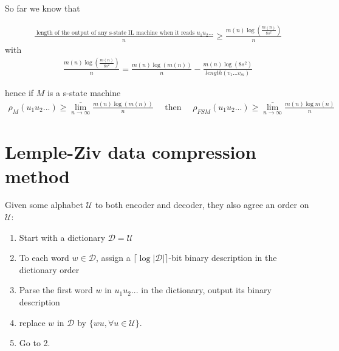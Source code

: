 \documentclass{article}
\theoremstyle{definition} %
\def\D{\mathcal{D}}
\def\U{\mathcal{U}}
\begin{document}
So far we know that

\begin{align*}
  \frac{\text{ length of the output of any s-state IL machine when it reads } u_1 u_2 ... }{n} \geq \frac{m(n) \log(\frac{m(n)}{8 s^2})}{n}
\end{align*}
with
\begin{align*}
  \frac{m(n) \log(\frac{m(n)}{8 s^2})}{n} = \frac{m(n) \log(m(n))}{n} - \frac{m(n) \log(8 s^2)}{length(v_1 ... v_m)}
\end{align*}

hence if $M$ is a s-state machine
\begin{align*}
  \rho_M (u_1 u_2 ...) \geq \overline{\lim_{n \to \infty}} \frac{m(n) \log(m(n))}{n}
  \quad \text{ then } \quad
  \rho_{FSM} (u_1 u_2 ...) \geq \overline{\lim_{n \to \infty}} \frac{m(n) \log m(n)}{n}
\end{align*}



\newpage
\section{Lemple-Ziv data compression method}

Given some alphabet $\U$ to both encoder and decoder, they also agree an order on $\U$:

\begin{enumerate}
  \item Start with a dictionary $\D = \U$
  \item To each word $w \in \D$, assign a $\lceil \log |\D| \rceil $-bit binary description in the dictionary order
  \item Parse the first word $w$ in $u_1 u_2 ...$ in the dictionary, output its binary description
  \item replace $w$ in $\D$ by $\{ wu, \forall u \in \U \}$.
  \item Go to 2.
\end{enumerate}
\end{document}
